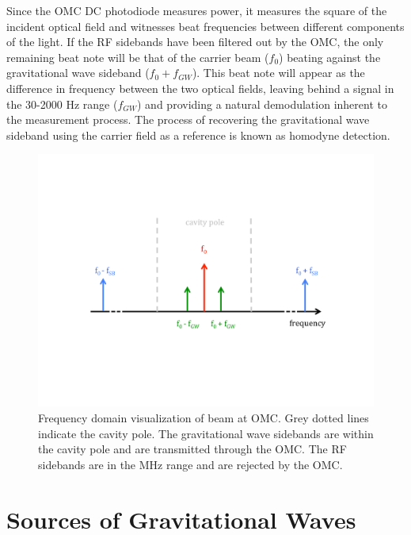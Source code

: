 Since the OMC DC photodiode measures power, it measures the square of the 
incident optical field and witnesses beat frequencies between different 
components of the light. If the RF sidebands have been filtered out by 
the OMC, the only remaining beat note will be that of the carrier beam ($f_0$) 
beating against the gravitational wave sideband ($f_0 + f_{GW}$). This beat note will 
appear as the difference in frequency between the two optical fields, 
leaving behind a signal in the 30-2000 Hz range ($f_{GW}$) and providing a 
natural demodulation inherent to the measurement process. 
The process of recovering the gravitational wave sideband using the 
carrier field as a reference is known as homodyne detection. 

\begin{figure}[ht!]
\includegraphics[width=\textwidth]{figures/introduction/omc-freq}
\caption[Sidebands and OMC cavity pole]{Frequency domain visualization of beam %
         at OMC. Grey dotted lines indicate the cavity pole. The gravitational %
         wave sidebands are within the cavity pole and are transmitted through %
         the OMC. The RF sidebands are in the MHz range and are rejected by the %
         OMC.}
\label{fig:omc-freq}
\end{figure}

\section{Sources of Gravitational Waves}

